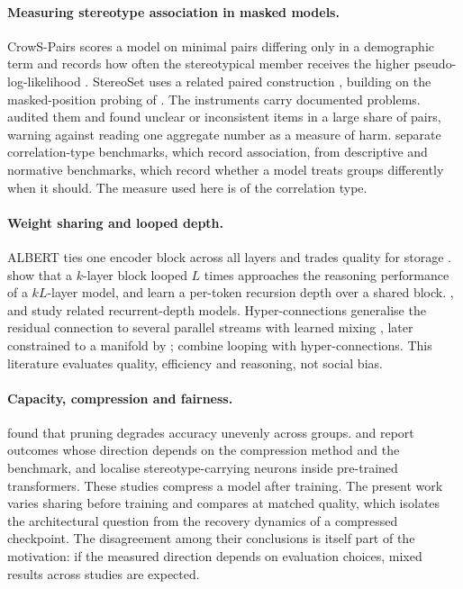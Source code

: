 \documentclass[sigconf,natbib=true,anonymous=true]{acmart}
\begin{document}
\paragraph{Measuring stereotype association in masked models.}
CrowS-Pairs scores a model on minimal pairs differing only in a demographic term
and records how often the stereotypical member receives the higher
pseudo-log-likelihood \citep{nangia2020crows}. StereoSet uses a related paired
construction \citep{nadeem2021stereoset}, building on the masked-position probing
of \citet{kurita2019measuring}. The instruments carry documented problems.
\citet{blodgett2021salmon} audited them and found unclear or inconsistent items
in a large share of pairs, warning against reading one aggregate number as a
measure of harm. \citet{wang2025difference} separate correlation-type benchmarks,
which record association, from descriptive and normative benchmarks, which record
whether a model treats groups differently when it should. The measure used here
is of the correlation type.

\paragraph{Weight sharing and looped depth.}
ALBERT ties one encoder block across all layers and trades quality for storage
\citep{lan2020albert}. \citet{saunshi2025looped} show that a $k$-layer block
looped $L$ times approaches the reasoning performance of a $kL$-layer model, and
\citet{bae2025mor} learn a per-token recursion depth over a shared block.
\citet{geiping2025huginn}, \citet{zhu2025ouro} and \citet{frey2026adaptive} study
related recurrent-depth models. Hyper-connections generalise the residual
connection to several parallel streams with learned mixing
\citep{zhu2025hyperconnections}, later constrained to a manifold by
\citet{xie2025mhc}; \citet{zeitoun2026hyperloop} combine looping with
hyper-connections. This literature evaluates quality, efficiency and reasoning,
not social bias.

\paragraph{Capacity, compression and fairness.}
\citet{hooker2020characterising} found that pruning degrades accuracy unevenly
across groups. \citet{xu2022compression} and \citet{ramesh2023comparative} report
outcomes whose direction depends on the compression method and the benchmark,
and \citet{voria2026tracing} localise stereotype-carrying neurons inside
pre-trained transformers. These studies compress a model after training. The
present work varies sharing before training and compares at matched quality,
which isolates the architectural question from the recovery dynamics of a
compressed checkpoint. The disagreement among their conclusions is itself part of
the motivation: if the measured direction depends on evaluation choices, mixed
results across studies are expected.
\end{document}
